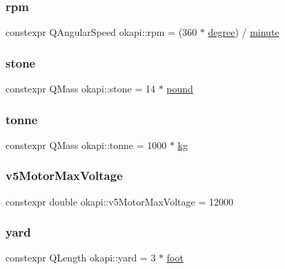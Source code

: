 \mbox{\label{namespaceokapi_a44d420085fe3c46220da4b11e5827453}} 
\subsubsection{\texorpdfstring{rpm}{rpm}}
{\footnotesize\ttfamily constexpr Q\+Angular\+Speed okapi\+::rpm = (360 $\ast$ \mbox{\hyperlink{namespaceokapi_a62211562b2e637742bd6e64748802211}{degree}}) / \mbox{\hyperlink{namespaceokapi_abce6256db60f015cf42c2b90cda699e3}{minute}}}

\mbox{\label{namespaceokapi_a023f7a7c757c8d9f08eebc0d94733fcf}} 
\subsubsection{\texorpdfstring{stone}{stone}}
{\footnotesize\ttfamily constexpr Q\+Mass okapi\+::stone = 14 $\ast$ \mbox{\hyperlink{namespaceokapi_a15f5612272759c7efdcab4bae5b4fa09}{pound}}}

\mbox{\label{namespaceokapi_a01ec1e54d8c7735cc150c1d7a06eced6}} 
\subsubsection{\texorpdfstring{tonne}{tonne}}
{\footnotesize\ttfamily constexpr Q\+Mass okapi\+::tonne = 1000 $\ast$ \mbox{\hyperlink{namespaceokapi_afcc67eb55c70e21f82cbee49aa19d05a}{kg}}}

\mbox{\label{namespaceokapi_a4507bf58013826d1597fd5e548175612}} 
\subsubsection{\texorpdfstring{v5MotorMaxVoltage}{v5MotorMaxVoltage}}
{\footnotesize\ttfamily constexpr double okapi\+::v5\+Motor\+Max\+Voltage = 12000\hspace{0.3cm}{\ttfamily [static]}}

\mbox{\label{namespaceokapi_a2e7618c6657c2a4c9d267a045f627f1e}} 
\subsubsection{\texorpdfstring{yard}{yard}}
{\footnotesize\ttfamily constexpr Q\+Length okapi\+::yard = 3 $\ast$ \mbox{\hyperlink{namespaceokapi_a76974d5bf7ed9473b2d59153894a8587}{foot}}}


